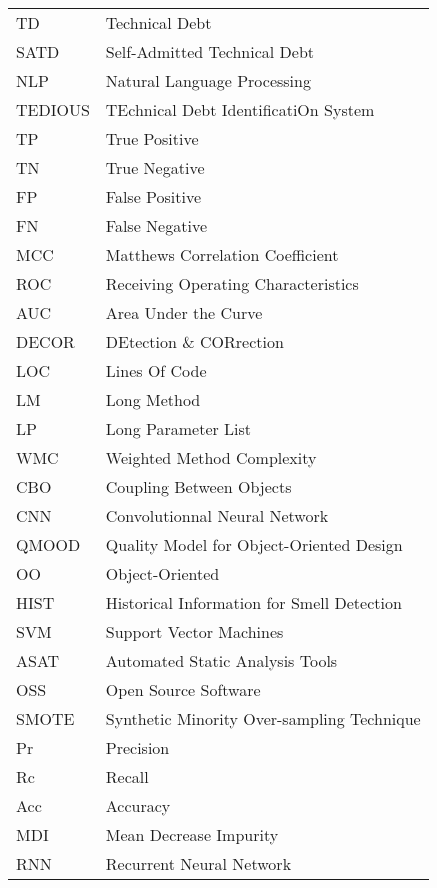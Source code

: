 \begin{longtable}{lp{5in}}
TD			    & Technical Debt\\
SATD		 & Self-Admitted Technical Debt\\
NLP			   & Natural Language Processing\\
TEDIOUS	   & TEchnical Debt IdentificatiOn System\\
TP				& True Positive\\
TN				& True Negative\\
FP				& False Positive\\
FN				& False Negative\\
MCC			  & Matthews Correlation Coefficient\\
ROC			  & Receiving Operating Characteristics\\
AUC			  & Area Under the Curve\\
DECOR	    & DEtection \& CORrection\\
LOC			   & Lines Of Code\\
LM				& Long Method\\
LP				 & Long Parameter List\\
WMC			 & Weighted Method Complexity\\
CBO			  & Coupling Between Objects\\
CNN			  & Convolutionnal Neural Network\\
QMOOD	   & Quality Model for Object-Oriented Design\\
OO			   & Object-Oriented\\
HIST		   & Historical Information for Smell Detection\\
SVM			  & Support Vector Machines\\
ASAT		  & Automated Static Analysis Tools\\
OSS			   & Open Source Software\\
SMOTE		& Synthetic Minority Over-sampling Technique\\
Pr				 & Precision\\
Rc				 & Recall\\
Acc			    & Accuracy\\
MDI			    & Mean Decrease Impurity\\
RNN			   & Recurrent Neural Network\\
\end{longtable}

